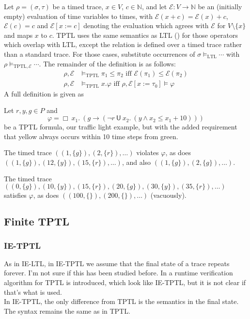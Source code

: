 \documentclass[a4paper]{article}
\newcommand{\U}{\mathsf{U}}
\newcommand{\tiff}{\text{ iff }}
\newcommand{\eval}{\mathcal{E}}
\begin{document}
\begin{defn}\label{tptlsem}

  Let $\rho = (\sigma,\tau)$ be a timed trace, $x\in V$, $c\in\mathbb{N}$, and let $\eval:V\to\mathbb{N}$ be an (initially empty) evaluation of time variables to times, with $\eval(x + c) = \eval(x) + c$, $\eval(c) = c$ and $\eval[x:=c]$ denoting the evaluation which agrees with $\eval$ for $V\setminus\{x\}$ and maps $x$ to $c$.
  TPTL uses the same semantics as LTL () for those operators which overlap with LTL, except the relation is defined over a timed trace rather than a standard trace. For those cases, substitute occurrences of $\sigma\vDash_{\text{LTL}}\cdots$ with $\rho\vDash_{\text{TPTL},\eval}\cdots$. The remainder of the definition is as follows:
  \begin{align*}
    \rho,\eval &\vDash_{\text{TPTL}}\pi_1\leq\pi_2 \tiff \eval(\pi_1)\leq\eval(\pi_2)\\
    \rho,\eval &\vDash_{\text{TPTL}} x.\varphi \tiff \rho,\eval[x:=\tau_0]\vDash\varphi
  \end{align*}
  A full definition is given as 
\end{defn}

\begin{eg}\label{tptleg}
  Let $r,y,g\in P$ and \[\varphi = \Box ~x_1.~ (g \to (\neg r ~\U~ x_2.~ (y \land x_2 \leq x_1 + 10) ))\] be a TPTL formula, our traffic light example, but with the added requirement that yellow always occurs within 10 time steps from green.

  The timed trace $((1,\{g\}),(2,\{r\}),\dots)$ violates $\varphi$, as does $((1,\{g\}),(12,\{y\}),(15,\{r\}),\dots)$, and also $((1,\{g\}),(2,\{g\}),\dots)$.

  The timed trace $((0,\{g\}),(10,\{y\}),(15,\{r\}),(20,\{g\}),(30,\{y\}),(35,\{r\}),\dots)$ satisfies $\varphi$, as does $((100,\{\}),(200,\{\}),\dots)$ (vacuously).

\end{eg}

\subsection{Finite TPTL}

\subsubsection{IE-TPTL} As in IE-LTL, in IE-TPTL we assume that the final state of a trace repeats forever.  I'm not sure if this has been studied before. In \textcite{chai2013rewriting} a runtime verification algorithm for TPTL is introduced, which look like IE-TPTL, but it is not clear if that's what is used.\\
In IE-TPTL, the only difference from TPTL is the semantics in the final state. The syntax remains the same as in TPTL.
\end{document}

